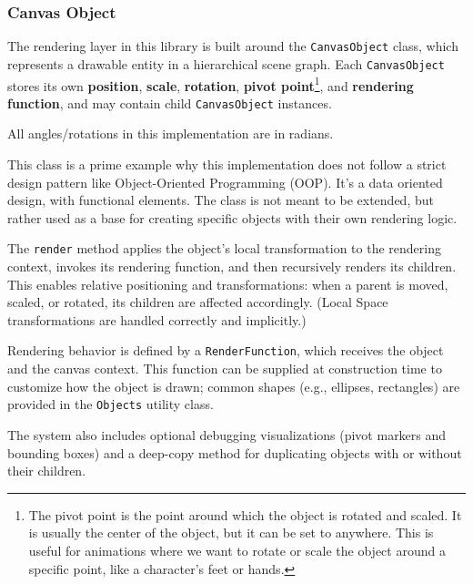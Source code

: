 \vspace{45pt}

\subsubsection{Canvas Object}
\label{subsubsec:canvas-object}

The rendering layer in this library is built around the {\footnotesize\texttt{CanvasObject}} class, which represents a drawable entity in a hierarchical scene graph. Each {\footnotesize\texttt{CanvasObject}} stores its own \textbf{position}, \textbf{scale}, \textbf{rotation}, \textbf{pivot point}\footnote{The pivot point is the point around which the object is rotated and scaled. It is usually the center of the object, but it can be set to anywhere. This is useful for animations where we want to rotate or scale the object around a specific point, like a character's feet or hands.}, and \textbf{rendering function}, and may contain child {\footnotesize\texttt{CanvasObject}} instances.

\begin{Note}
    All angles/rotations in this implementation are in radians.
\end{Note}

\begin{Note}
    This class is a prime example why this implementation does not follow a strict design pattern like Object-Oriented Programming (OOP). It's a data oriented design, with functional elements. The class is not meant to be extended, but rather used as a base for creating specific objects with their own rendering logic.
\end{Note}

The {\footnotesize\texttt{render}} method applies the object's local transformation to the rendering context, invokes its rendering function, and then recursively renders its children. This enables relative positioning and transformations: when a parent is moved, scaled, or rotated, its children are affected accordingly. (Local Space transformations are handled correctly and implicitly.)

Rendering behavior is defined by a {\footnotesize\texttt{RenderFunction}}, which receives the object and the canvas context. This function can be supplied at construction time to customize how the object is drawn; common shapes (e.g., ellipses, rectangles) are provided in the {\footnotesize\texttt{Objects}} utility class.

The system also includes optional debugging visualizations (pivot markers and bounding boxes) and a deep-copy method for duplicating objects with or without their children.

